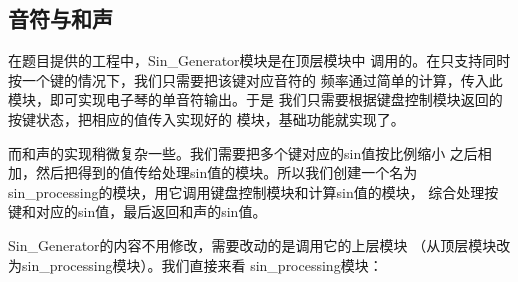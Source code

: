 \documentclass[12pt,a4paper,UTF8]{article}
\begin{document}
\subsection{音符与和声}
在题目提供的工程中，\mbox{Sin\_Generator}模块是在顶层模块中
调用的。在只支持同时按一个键的情况下，我们只需要把该键对应音符的
频率通过简单的计算，传入此模块，即可实现电子琴的单音符输出。于是
我们只需要根据键盘控制模块返回的按键状态，把相应的值传入实现好的
模块，基础功能就实现了。

而和声的实现稍微复杂一些。我们需要把多个键对应的sin值按比例缩小
之后相加，然后把得到的值传给处理sin值的模块。所以我们创建一个名为
\mbox{sin\_processing}的模块，用它调用键盘控制模块和计算sin值的模块，
综合处理按键和对应的sin值，最后返回和声的sin值。

\mbox{Sin\_Generator}的内容不用修改，需要改动的是调用它的上层模块
（从顶层模块改为\mbox{sin\_processing}模块）。我们直接来看
\mbox{sin\_processing}模块：
\end{document}
